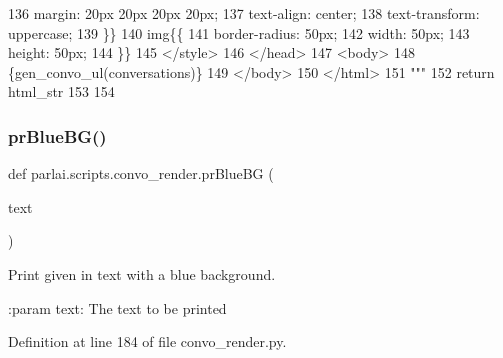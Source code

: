 \begin{DoxyCode}
136 \textcolor{stringliteral}{            margin: 20px 20px 20px 20px;}
137 \textcolor{stringliteral}{            text-align: center;}
138 \textcolor{stringliteral}{            text-transform: uppercase;}
139 \textcolor{stringliteral}{        \}\}}
140 \textcolor{stringliteral}{        img\{\{}
141 \textcolor{stringliteral}{          border-radius: 50px;}
142 \textcolor{stringliteral}{          width: 50px;}
143 \textcolor{stringliteral}{          height: 50px;}
144 \textcolor{stringliteral}{        \}\}}
145 \textcolor{stringliteral}{    </style>}
146 \textcolor{stringliteral}{</head>}
147 \textcolor{stringliteral}{<body>}
148 \textcolor{stringliteral}{\{gen\_convo\_ul(conversations)\}}
149 \textcolor{stringliteral}{</body>}
150 \textcolor{stringliteral}{</html>}
151 \textcolor{stringliteral}{    """}
152     \textcolor{keywordflow}{return} html\_str
153 
154 
\end{DoxyCode}
\mbox{\label{namespaceparlai_1_1scripts_1_1convo__render_a21a7681b9803eb6994ac72c7d480cb94}} 
\subsubsection{\texorpdfstring{pr\+Blue\+B\+G()}{prBlueBG()}}
{\footnotesize\ttfamily def parlai.\+scripts.\+convo\+\_\+render.\+pr\+Blue\+BG (\begin{DoxyParamCaption}\item[{}]{text }\end{DoxyParamCaption})}

\begin{DoxyVerb}Print given in text with a blue background.

:param text: The text to be printed
\end{DoxyVerb}
 

Definition at line 184 of file convo\+\_\+render.\+py.


